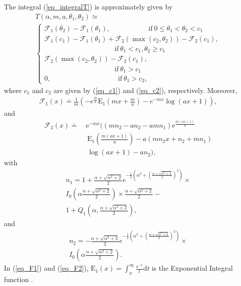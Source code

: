 \begin{lem}\label{Lemma3}
The integral (\ref{eq_integralT}) is approximately given by
\begin{align}
  T(\alpha,m,a,\theta_1,\theta_2)\simeq~~~~~~~~~~~~~~~~~~~~~~~~~~~~~~~~~~~~~~~~~~~~~~~~~~\nonumber\\
\begin{cases}
\mathcal{F}_1(\theta_2)-\mathcal{F}_1(\theta_1), ~~~~~~~~~~~~~~~~~~~~~~~~~\mathrm{if}~  0\leq\theta_1<\theta_2 < c_1  \\ 
\mathcal{F}_1(c_1)-\mathcal{F}_1(\theta_1)+\mathcal{F}_2(\max(c_2,\theta_2))-\mathcal{F}_2(c_1),  \\~~~~~~~~~~~~~~~~~~~~~~~~~~~~~~~~~~~~~~~~~~~~~~\mathrm{if}~ \theta_1<c_1, \theta_2\geq c_1\\
 \mathcal{F}_2(\max(c_2,\theta_2))-\mathcal{F}_2(c_1), \\~~~~~~~~~~~~~~~~~~~~~~~~~~~~~~~~~~~~~~~~~~~~~~\mathrm{if}~ \theta_1>c_1\\
0, ~~~~~~~~~~~~~~~~~~~~~~~~~~~~~~~~~~~~~~~~~~~~\mathrm{if}~ \theta_1 > c_2,
\end{cases}  
\end{align}
where 
$c_1$ and $c_2$ are given by (\ref{eq_c1}) and (\ref{eq_c2}), respectively. Moreover,
\begin{align}\label{eq_F1}
    \mathcal{F}_1(x) \doteq \frac{1}{m}\left(-e^{\frac{m}{a}}\operatorname{E_1}\left(mx+\frac{m}{a}\right)-e^{-mx}\log(ax+1)\right),
\end{align}
and
\begin{align}\label{eq_F2}
    \mathcal{F}_2(x) \doteq &~ \mathrm{e}^{-mx}\Bigg(\left(mn_2-an_2-amn_1\right)\mathrm{e}^\frac{m\left(ax+1\right)}{a}\nonumber\\&~~ \operatorname{E_1}\left(\frac{m\left(ax+1\right)}{a}\right)-
    a\left(mn_2x+n_2+mn_1\right)\nonumber\\&~~\log\left(ax+1\right)-an_2\Bigg),
\end{align}
with
\begin{align}\label{eq_n1}
    n_1 = 1+\frac{\alpha+\sqrt{\alpha^2+2}}{2} e^{-\frac{1}{2}\left(\alpha^2+\left(\frac{\alpha+\sqrt{\alpha^2+2}}{2}\right)^2\right)}\times\nonumber\\
 I_0\left(\alpha\frac{\alpha+\sqrt{\alpha^2+2}}{2}\right)\times\frac{\alpha+\sqrt{\alpha^2+2}}{2}-\nonumber\\
 1+Q_1\left(\alpha,\frac{\alpha+\sqrt{\alpha^2+2}}{2}\right),
\end{align}
and
\begin{align}\label{eq_n2}
    n_2 = -\frac{\alpha+\sqrt{\alpha^2+2}}{2} e^{-\frac{1}{2}\left(\alpha^2+\left(\frac{\alpha+\sqrt{\alpha^2+2}}{2}\right)^2\right)}\times\nonumber\\
 I_0\left(\alpha\frac{\alpha+\sqrt{\alpha^2+2}}{2}\right).
\end{align}
In (\ref{eq_F1}) and (\ref{eq_F2}), $\operatorname{E_1}(x) = \int_x^{\infty} \frac{e^{-t}}{t} \mathrm{d}t$ is the Exponential Integral function \cite[p. 228, (5.1.1)]{abramowitz1999ia}.
\end{lem}

